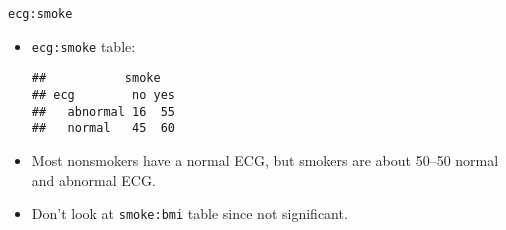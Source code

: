 \begin{frame}[fragile]{\texttt{ecg:smoke}}
  
  \begin{itemize}
\item \texttt{ecg:smoke} table:
  
  
  
\begin{knitrout}
\color{fgcolor}\begin{kframe}
\begin{alltt}
\hlopt{~}\hlopt{+}
\end{alltt}
\begin{verbatim}
##           smoke
## ecg        no yes
##   abnormal 16  55
##   normal   45  60
\end{verbatim}
\end{kframe}
\end{knitrout}

\item Most nonsmokers have a normal ECG, but smokers are about 50--50
  normal and abnormal ECG.
  
  \item Don't look at \texttt{smoke:bmi} table since not significant. 
  
  \end{itemize}
  
\end{frame}



